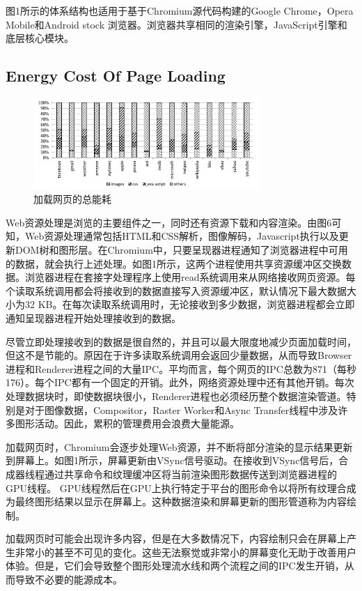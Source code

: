 \documentclass{sig-alternate-05-2015}
\begin{document}
图1所示的体系结构也适用于基于Chromium源代码构建的Google Chrome，Opera Mobile和Android stock 浏览器\cite{6}\cite{8}。浏览器共享相同的渲染引擎，JavaScript引擎和底层核心模块。

\subsection{Energy Cost Of Page Loading}

\begin{figure}[htbp]
	\centering
	\includegraphics[width=3.4in]{./figure6}
	\caption{加载网页的总能耗}\label{fig:tasks}
\end{figure}

Web资源处理是浏览的主要组件之一，同时还有资源下载和内容渲染。由图6\cite{13}可知，Web资源处理通常包括HTML和CSS解析，图像解码，Javascript执行以及更新DOM树和图形层。在Chromium中，只要呈现器进程通知了浏览器进程中可用的数据，就会执行上述处理。如图1所示，这两个进程使用共享资源缓冲区交换数据。浏览器进程在套接字处理程序上使用read系统调用来从网络接收网页资源。每个读取系统调用都会将接收到的数据直接写入资源缓冲区，默认情况下最大数据大小为32 KB。在每次读取系统调用时，无论接收到多少数据，浏览器进程都会立即通知呈现器进程开始处理接收到的数据。

尽管立即处理接收到的数据是很自然的，并且可以最大限度地减少页面加载时间，但这不是节能的。原因在于许多读取系统调用会返回少量数据，从而导致Browser进程和Renderer进程之间的大量IPC。平均而言，每个网页的IPC总数为871（每秒176）。每个IPC都有一个固定的开销。此外，网络资源处理中还有其他开销。每次处理数据块时，即使数据块很小，Renderer进程也必须经历整个数据渲染管道。特别是对于图像数据，Compositor，Raster Worker和Async Transfer线程中涉及许多图形活动。因此，累积的管理费用会浪费大量能源。

加载网页时，Chromium会逐步处理Web资源，并不断将部分渲染的显示结果更新到屏幕上。如图1所示，屏幕更新由VSync信号驱动。在接收到VSync信号后，合成器线程通过共享命令和纹理缓冲区将当前渲染图形数据传送到浏览器进程的GPU线程。 GPU线程然后在GPU上执行特定于平台的图形命令以将所有纹理合成为最终图形结果以显示在屏幕上。这种数据渲染和屏幕更新的图形管道称为内容绘制。

加载网页时可能会出现许多内容，但是在大多数情况下，内容绘制只会在屏幕上产生非常小的甚至不可见的变化。这些无法察觉或非常小的屏幕变化无助于改善用户体验。但是，它们会导致整个图形处理流水线和两个流程之间的IPC发生开销，从而导致不必要的能源成本。
\end{document}
